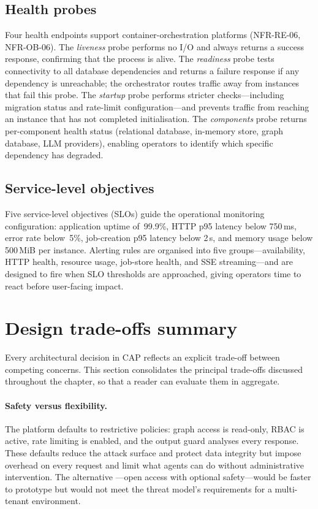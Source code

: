 \documentclass[a4paper]{sapthesis}
\begin{document}
\subsection{Health probes}

Four health endpoints support container-orchestration platforms
(NFR-RE-06, NFR-OB-06).  The \emph{liveness} probe performs no I/O and
always returns a success response, confirming that the process is alive.
The \emph{readiness} probe tests connectivity to all database dependencies
and returns a failure response if any dependency is unreachable; the
orchestrator routes traffic away from instances that fail this probe.
The \emph{startup} probe performs stricter checks---including migration
status and rate-limit configuration---and prevents traffic from reaching
an instance that has not completed initialisation.  The \emph{components}
probe returns per-component health status (relational database, in-memory
store, graph database, LLM providers), enabling operators to identify
which specific dependency has degraded.

\subsection{Service-level objectives}

Five service-level objectives (SLOs) guide the operational monitoring
configuration: application uptime of~99.9\%, HTTP p95 latency below
750\,ms, error rate below~5\%, job-creation p95 latency below 2\,s, and
memory usage below 500\,MiB per instance.  Alerting rules are organised
into five groups---availability, HTTP health, resource usage, job-store
health, and SSE streaming---and are designed to fire when SLO thresholds
are approached, giving operators time to react before user-facing impact.


\section{Design trade-offs summary}
\label{sec:design-tradeoffs}

Every architectural decision in CAP reflects an explicit trade-off between
competing concerns.  This section consolidates the principal trade-offs
discussed throughout the chapter, so that a reader can evaluate them in
aggregate.

\paragraph{Safety versus flexibility.}
The platform defaults to restrictive policies: graph access is
read-only, RBAC is active, rate limiting is enabled, and the output guard
analyses every response.  These defaults reduce the attack surface and
protect data integrity but impose overhead on every request and limit
what agents can do without administrative intervention.  The alternative
---open access with optional safety---would be faster to prototype but
would not meet the threat model's requirements for a multi-tenant
environment.
\end{document}
